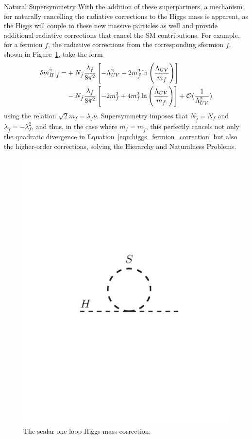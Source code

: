 \begin{section}{Natural Supersymmetry}
With the addition of these superpartners, a mechanism for naturally cancelling the radiative corrections to the Higgs mass is apparent, as the Higgs will couple to these new massive particles as well and provide additional radiative corrections that cancel the SM contributions.
For example, for a fermion $f$, the radiative corrections from the corresponding sfermion $\tilde{f}$, shown in Figure~\ref{fig:higgs_scalar_loop}, take the form
\begin{align}
\delta m_{H}^2|_{\tilde{f}} = &+N_{\tilde{f}}\frac{\lambda_{\tilde{f}}}{8\pi^2} \left[-\Lambda^2_{UV} + 2m_{\tilde{f}}^2\ln\left(\frac{\Lambda_{UV}}{m_{\tilde{f}}}\right)\right] \nonumber \\
                            &-N_{\tilde{f}}\frac{\lambda_{\tilde{f}}}{8\pi^2} \left[-2m_f^2 + 4m_f^2\ln\left(\frac{\Lambda_{UV}}{m_{\tilde{f}}}\right)\right] + \mathcal{O}(\frac{1}{\Lambda^2_{UV}})
\end{align}
using the relation $\sqrt{2}m_f = \lambda_f\nu$.
Supersymmetry imposes that $N_{\tilde{f}} = N_f$ and $\lambda_{\tilde{f}} = -\lambda_f^2$, and thus, in the case where $m_f = m_{\tilde{f}}$, this perfectly cancels not only the quadratic divergence in Equation~\ref{eqn:higgs_fermion_correction} but also the higher-order corrections, solving the Hierarchy and Naturalness Problems.

\begin{figure}[tbp!]
\begin{center}
\includegraphics[angle=0,width=0.60\columnwidth]{fig/higgs_scalar_loop.pdf}
\end{center}
\caption{The scalar one-loop Higgs mass correction.}
\label{fig:higgs_scalar_loop}
\end{figure}


\end{section}
